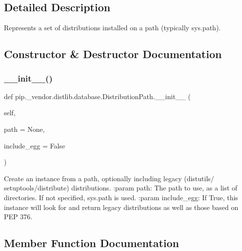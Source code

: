 \subsection{Detailed Description}
\begin{DoxyVerb}Represents a set of distributions installed on a path (typically sys.path).
\end{DoxyVerb}
 

\subsection{Constructor \& Destructor Documentation}
\mbox{\label{classpip_1_1__vendor_1_1distlib_1_1database_1_1DistributionPath_a17a2afe7db83a808ad93c909d99ed955}} 
\subsubsection{\texorpdfstring{\+\_\+\+\_\+init\+\_\+\+\_\+()}{\_\_init\_\_()}}
{\footnotesize\ttfamily def pip.\+\_\+vendor.\+distlib.\+database.\+Distribution\+Path.\+\_\+\+\_\+init\+\_\+\+\_\+ (\begin{DoxyParamCaption}\item[{}]{self,  }\item[{}]{path = {\ttfamily None},  }\item[{}]{include\+\_\+egg = {\ttfamily False} }\end{DoxyParamCaption})}

\begin{DoxyVerb}Create an instance from a path, optionally including legacy (distutils/
setuptools/distribute) distributions.
:param path: The path to use, as a list of directories. If not specified,
     sys.path is used.
:param include_egg: If True, this instance will look for and return legacy
            distributions as well as those based on PEP 376.
\end{DoxyVerb}
 

\subsection{Member Function Documentation}
\mbox{\label{classpip_1_1__vendor_1_1distlib_1_1database_1_1DistributionPath_a576c17cc01238d807b4cc7b833001b0b}} 
